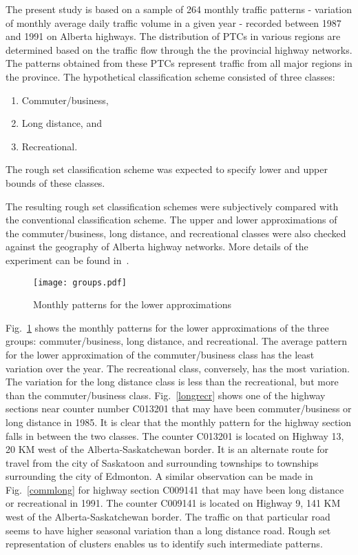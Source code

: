 \documentclass[oribibl]{llncs}
\begin{document}
The present study is based on a
sample of 264 monthly traffic patterns -
variation of monthly average
daily traffic volume in a given year -
recorded between 1987
and 1991 on Alberta highways.
The distribution of PTCs in various regions
are determined based on the traffic flow
through the the provincial highway networks.
The patterns obtained from these PTCs
represent traffic from all major regions in the
province.
The hypothetical classification scheme
consisted of three classes:
\begin{enumerate}
\item Commuter/business,

\item Long distance, and

\item Recreational.
\end{enumerate}

The rough set classification scheme
was expected to specify lower
and upper bounds of these classes.

The resulting rough set classification schemes were
subjectively compared with the conventional
classification scheme.
The upper and lower approximations of the commuter/business,
long distance, and recreational classes were also checked against
the geography of Alberta highway networks.
More details of the experiment can be found in~\cite{Lingras2001}.

\begin{figure}
\centerline{\texttt{[image: groups.pdf]}}
\caption{Monthly patterns for the lower approximations}
\label{groups}
\end{figure}

Fig.~\ref{groups} shows the monthly patterns
for the lower approximations of the
three groups: commuter/business,
long distance, and recreational.
The average
pattern for the lower approximation
of the commuter/business class has the
least variation over the year.
The recreational class,
conversely,
has the most variation.
The variation for the long distance class
is less than the recreational, but more
than the commuter/business class.
Fig.~\ref{longrecr}
shows one of the highway sections
near counter number C013201
that may have been
commuter/business or long distance
in 1985.
It is clear that the monthly pattern for
the highway section falls in between
the two classes.
The counter C013201 is located on
Highway 13, 20 KM west of the
Alberta-Saskatchewan border.
It is an alternate route
for travel from the city of Saskatoon
and surrounding townships to
townships surrounding the city of Edmonton.
A similar observation can be made
in Fig.~\ref{commlong} for
highway section C009141
that may have been long distance
or recreational in 1991.
The counter C009141 is located on
Highway 9, 141 KM west of the
Alberta-Saskatchewan border.
The traffic on that particular road seems
to have higher seasonal variation
than a long distance road.
Rough set representation of clusters
enables us to identify such 
intermediate patterns.
\end{document}

